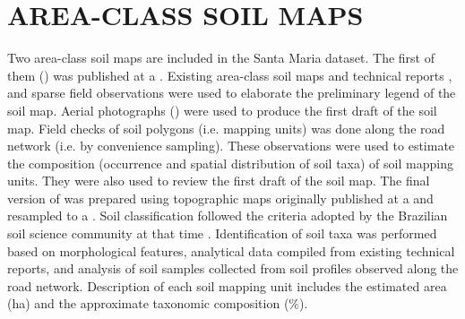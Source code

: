 
\section{AREA-CLASS SOIL MAPS}
\label{sec:chap05-soil-maps}

Two area-class soil maps are included in the Santa Maria dataset. The first of them (\soilOld{}) was published 
at a  \cite{AzolinEtAl1988}. Existing area-class soil maps and technical reports 
\cite{Brasil1973, Azolin1977, MacielEtAl1987a, MacielEtAl1987, AbraoEtAl1988}, and sparse field observations 
were used to elaborate the preliminary legend of the soil map. Aerial photographs () were used to 
produce the first draft of the soil map. Field checks of soil polygons (i.e. mapping units) was done along the 
road network (i.e. by convenience sampling). These observations were used to estimate the composition 
(occurrence and spatial distribution of soil taxa) of soil mapping units. They were also used to review the 
first draft of the soil 
map. The final version of \soilOld{} was prepared using topographic maps originally published at a 
 and resampled to a . Soil classification followed the criteria adopted by the 
Brazilian soil science community at that time \cite{Brasil1973, CamargoEtAl1982, Carvalho1982, LemosEtAl1982, 
OlmosEtAl1982}. Identification of soil taxa was performed based on morphological features, analytical data 
compiled from existing technical reports, and analysis of soil samples collected from soil profiles observed 
along the road network. Description of each soil mapping unit includes the estimated area (\si{\hectare}) and 
the approximate taxonomic composition (\si{\percent}).

